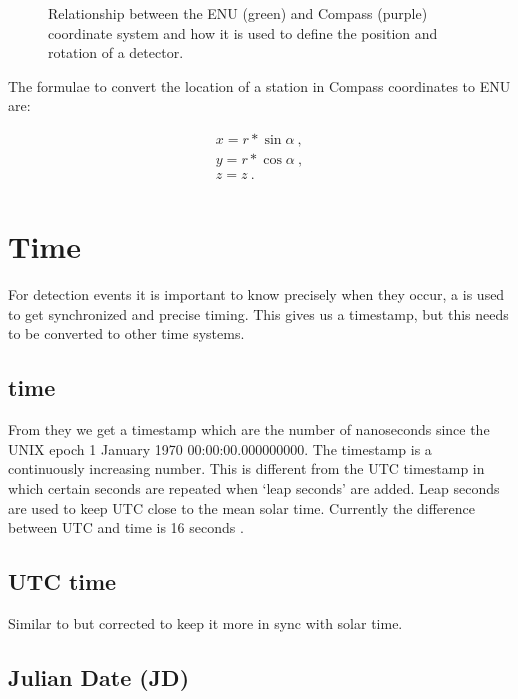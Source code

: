 \begin{figure}
    \centering
    
    \caption{Relationship between the ENU (green) and Compass (purple)
             coordinate system and how it is used to define the position
             and rotation of a detector.}
    \label{fig:enu_compass}
\end{figure}

The formulae to convert the location of a station in Compass coordinates
to ENU are:

\begin{equation}
    \begin{array}{l}
        x = r * \sin{\alpha} \ , \\
        y = r * \cos{\alpha} \ , \\
        z = z \ . \\
    \end{array}
\end{equation}


\section{Time}

For \hisparc detection events it is important to know precisely when
they occur, a \gps is used to get synchronized and precise timing. This
gives us a timestamp, but this needs to be converted to other time
systems.


\subsection{\gps time}

From they \gps we get a timestamp which are the number of nanoseconds
since the UNIX epoch 1 January 1970 00:00:00.000000000. The \gps
timestamp is a continuously increasing number. This is different from
the UTC timestamp in which certain seconds are repeated when `leap
seconds' are added. Leap seconds are used to keep UTC close to the mean
solar time. Currently the difference between UTC and \gps time is 16
seconds \cite{usno:2012aa}.


\subsection{UTC time}

Similar to \gps but corrected to keep it more in sync with solar time.


\subsection{Julian Date (JD)}

